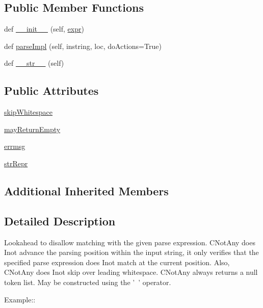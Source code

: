 \subsection*{Public Member Functions}
\begin{DoxyCompactItemize}
\item 
def \hyperlink{classsetuptools_1_1__vendor_1_1pyparsing_1_1NotAny_ad7c0c2e1d034bc70513e488b453615b5}{\+\_\+\+\_\+init\+\_\+\+\_\+} (self, \hyperlink{classsetuptools_1_1__vendor_1_1pyparsing_1_1ParseElementEnhance_a445450bd765a74cc1d1567e40cade40d}{expr})
\item 
def \hyperlink{classsetuptools_1_1__vendor_1_1pyparsing_1_1NotAny_a5616d73be8c8300fb5d3797182c181ac}{parse\+Impl} (self, instring, loc, do\+Actions=True)
\item 
def \hyperlink{classsetuptools_1_1__vendor_1_1pyparsing_1_1NotAny_a0804f162972e6573bac7acd41fa5f088}{\+\_\+\+\_\+str\+\_\+\+\_\+} (self)
\end{DoxyCompactItemize}
\subsection*{Public Attributes}
\begin{DoxyCompactItemize}
\item 
\hyperlink{classsetuptools_1_1__vendor_1_1pyparsing_1_1NotAny_a5dfba9562b71648992a7b6e839e41166}{skip\+Whitespace}
\item 
\hyperlink{classsetuptools_1_1__vendor_1_1pyparsing_1_1NotAny_add7a6d02ddea84873067d731b1e4009a}{may\+Return\+Empty}
\item 
\hyperlink{classsetuptools_1_1__vendor_1_1pyparsing_1_1NotAny_a690147669f455e71bdcb4744cbeff3e6}{errmsg}
\item 
\hyperlink{classsetuptools_1_1__vendor_1_1pyparsing_1_1NotAny_ae897e111ba73e18c7c62a8515338bcf3}{str\+Repr}
\end{DoxyCompactItemize}
\subsection*{Additional Inherited Members}


\subsection{Detailed Description}
\begin{DoxyVerb}Lookahead to disallow matching with the given parse expression.  C{NotAny}
does I{not} advance the parsing position within the input string, it only
verifies that the specified parse expression does I{not} match at the current
position.  Also, C{NotAny} does I{not} skip over leading whitespace. C{NotAny}
always returns a null token list.  May be constructed using the '~' operator.

Example::\end{DoxyVerb}
 

